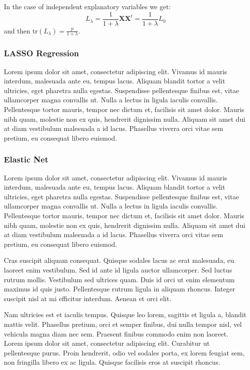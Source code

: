\documentclass[a4paper, nobind]{templates/ociamthesis}
\theoremstyle{definition}
\theoremstyle{definition}
\theoremstyle{definition}
\theoremstyle{remark}
\begin{document}
In the case of independent explanatory variables we get:
\[
L_{\lambda} = \frac{1}{1+\lambda} \boldsymbol{X} \boldsymbol{X}^t = \frac{1}{1+\lambda} L_0
\]
and then \(\text{tr}\left(L_{\lambda}\right) = \frac{p}{1+\lambda}\).

\newpage

\hypertarget{lasso-regression}{%
\subsubsection{LASSO Regression}\label{lasso-regression}}

Lorem ipsum dolor sit amet, consectetur adipiscing elit. Vivamus id mauris interdum, malesuada ante eu, tempus lacus. Aliquam blandit tortor a velit ultricies, eget pharetra nulla egestas. Suspendisse pellentesque finibus est, vitae ullamcorper magna convallis ut. Nulla a lectus in ligula iaculis convallis. Pellentesque tortor mauris, tempor nec dictum et, facilisis sit amet dolor. Mauris nibh quam, molestie non ex quis, hendrerit dignissim nulla. Aliquam sit amet dui at diam vestibulum malesuada a id lacus. Phasellus viverra orci vitae sem pretium, eu consequat libero euismod.

\hypertarget{elastic-net}{%
\subsubsection{Elastic Net}\label{elastic-net}}

Lorem ipsum dolor sit amet, consectetur adipiscing elit. Vivamus id mauris interdum, malesuada ante eu, tempus lacus. Aliquam blandit tortor a velit ultricies, eget pharetra nulla egestas. Suspendisse pellentesque finibus est, vitae ullamcorper magna convallis ut. Nulla a lectus in ligula iaculis convallis. Pellentesque tortor mauris, tempor nec dictum et, facilisis sit amet dolor. Mauris nibh quam, molestie non ex quis, hendrerit dignissim nulla. Aliquam sit amet dui at diam vestibulum malesuada a id lacus. Phasellus viverra orci vitae sem pretium, eu consequat libero euismod.

Cras suscipit aliquam consequat. Quisque sodales lacus ac erat malesuada, eu laoreet enim vestibulum. Sed id ante id ligula auctor ullamcorper. Sed luctus rutrum mollis. Vestibulum sed ultrices quam. Duis id orci ut enim elementum maximus id quis justo. Pellentesque rutrum ligula in aliquam rhoncus. Integer suscipit nisl at mi efficitur interdum. Aenean et orci elit.

Nam ultricies est et iaculis tempus. Quisque leo lorem, sagittis et ligula a, blandit mattis velit. Phasellus pretium, orci et semper finibus, dui nulla tempor nisl, vel vehicula magna diam nec sem. Praesent finibus commodo enim non laoreet. Lorem ipsum dolor sit amet, consectetur adipiscing elit. Curabitur ut pellentesque purus. Proin hendrerit, odio vel sodales porta, ex lorem feugiat sem, non fringilla libero ex ac ligula. Quisque facilisis eros at suscipit rhoncus.
\end{document}

